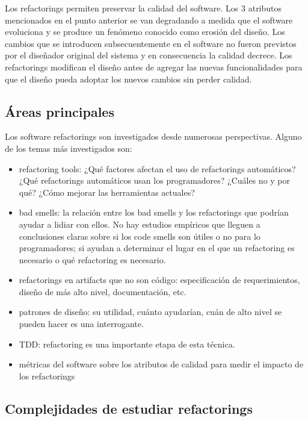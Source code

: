 Los refactorings permiten preservar la calidad del software. Los 3 atributos mencionados en el punto
anterior se van degradando a medida que el software evoluciona y se produce un fenómeno conocido
como erosión del diseño. Los cambios que se introducen subsecuentemente en el software no fueron
previstos por el diseñador original del sistema y en consecuencia la calidad decrece. Los
refactorings modifican el diseño antes de agregar las nuevas funcionalidades para que el diseño
pueda adoptar los nuevos cambios sin perder calidad.



\subsection{Áreas principales}
Los software refactorings son investigados desde numerosas perspectivas. Alguno de los temas más
investigados son:

\begin{itemize}
    \item refactoring tools: ¿Qué factores afectan el uso de refactorings automáticos? ¿Qué
refactorings automáticos usan los programadores? ¿Cuáles no y por qué? ¿Cómo mejorar las
herramientas actuales?
    \item bad smells: la relación entre los bad smells y los refactorings que podrían ayudar a
lidiar con ellos. No hay estudios empíricos que lleguen a conclusiones claras sobre si los code
smells son útiles o no para lo programadores; si ayudan a determinar el lugar en el que un
refactoring es necesario o qué refactoring es necesario.
    \item refactorings en artifacts que no son código: especificación de requerimientos, diseño de
    más alto nivel, documentación, etc.
    \item patrones de diseño: su utilidad, cuánto ayudarían, cuán de alto nivel se pueden hacer es
    una interrogante.
    \item TDD: refactoring es una importante etapa de esta técnica.
    \item métricas del software sobre los atributos de calidad para medir el impacto de los
refactorings  
\end{itemize}


\subsection{Complejidades de estudiar refactorings}

